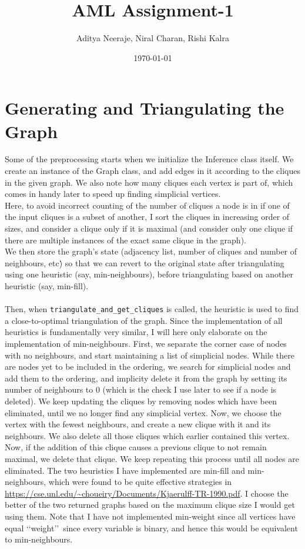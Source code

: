 \documentclass{article}
\title{AML Assignment-1}
\author{Aditya Neeraje, Niral Charan, Rishi Kalra}
\date{\today}
\begin{document}
\maketitle
\tableofcontents


\newpage

\section{Generating and Triangulating the Graph}
Some of the preprocessing starts when we initialize the Inference class itself. We create an instance of the Graph class, and add edges in it according to the cliques in the given graph. We also note how many cliques each vertex is part of, which comes in handy later to speed up finding simplicial vertices.\\
Here, to avoid incorrect counting of the number of cliques a node is in if one of the input cliques is a subset of another, I sort the cliques in increasing order of sizes, and consider a clique only if it is maximal (and consider only one clique if there are multiple instances of the exact same clique in the graph).\\
We then store the graph's state (adjacency list, number of cliques and number of neighbours, etc\.) so that we can revert to the original state after triangulating using one heuristic (say, min-neighbours), before triangulating based on another heuristic (say, min-fill).\\
\\
Then, when \texttt{triangulate\_and\_get\_cliques} is called, the heuristic is used to find a close-to-optimal triangulation of the graph. Since the implementation of all heuristics is fundamentally very similar, I will here only elaborate on the implementation of min-neighbours. First, we separate the corner case of nodes with no neighbours, and start maintaining a list of simplicial nodes. While there are nodes yet to be included in the ordering, we search for simplicial nodes and add them to the ordering, and implicity delete it from the graph by setting its number of neighbours to 0 (which is the check I use later to see if a node is deleted). We keep updating the cliques by removing nodes which have been eliminated, until we no longer find any simplicial vertex. Now, we choose the vertex with the fewest neighbours, and create a new clique with it and its neighbours. We also delete all those cliques which earlier contained this vertex. Now, if the addition of this clique causes a previous clique to not remain maximal, we delete that clique. We keep repeating this process until all nodes are eliminated.
The two heuristics I have implemented are min-fill and min-neighbours, which were found to be quite effective strategies in \url{https://cse.unl.edu/~choueiry/Documents/Kjaerulff-TR-1990.pdf}. I choose the better of the two returned graphs based on the maximum clique size I would get using them. Note that I have not implemented min-weight since all vertices have equal \lq\lq weight\rq\rq\ since every variable is binary, and hence this would be equivalent to min-neighbours.
\end{document}
